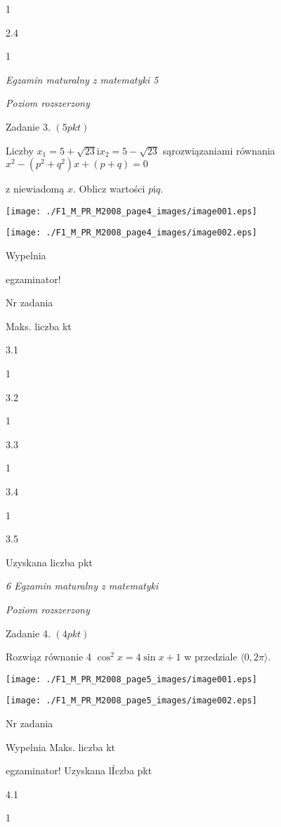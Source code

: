 \documentclass[a4paper,12pt]{article}
\begin{document}
1

2.4

1





{\it Egzamin maturalny z matematyki 5}

{\it Poziom rozszerzony}

Zadanie 3. $(5pkt)$

Liczby $x_{1}=5+\sqrt{23}\mathrm{i}x_{2}=5-\sqrt{23}$ sąrozwiązaniami równania $x^{2}-(p^{2}+q^{2})x+(p+q)=0$

z niewiadomą $x$. Oblicz wartości $p \mathrm{i}q.$
\begin{center}
\texttt{[image: ./F1\_M\_PR\_M2008\_page4\_images/image001.eps]}

\texttt{[image: ./F1\_M\_PR\_M2008\_page4\_images/image002.eps]}
\end{center}
Wypelnia

egzaminator!

Nr zadania

Maks. liczba kt

3.1

1

3.2

1

3.3

1

3.4

1

3.5

Uzyskana liczba pkt





{\it 6 Egzamin maturalny z matematyki}

{\it Poziom rozszerzony}

Zadanie 4. $(4pkt)$

Rozwiąz równanie 4 $\cos^{2}x=4\sin x+1$ w przedziale $\langle 0,2\pi\rangle.$
\begin{center}
\texttt{[image: ./F1\_M\_PR\_M2008\_page5\_images/image001.eps]}

\texttt{[image: ./F1\_M\_PR\_M2008\_page5\_images/image002.eps]}
\end{center}
Nr zadania

Wypelnia Maks. liczba kt

egzaminator! Uzyskana lÍczba pkt

4.1

1
\end{document}
